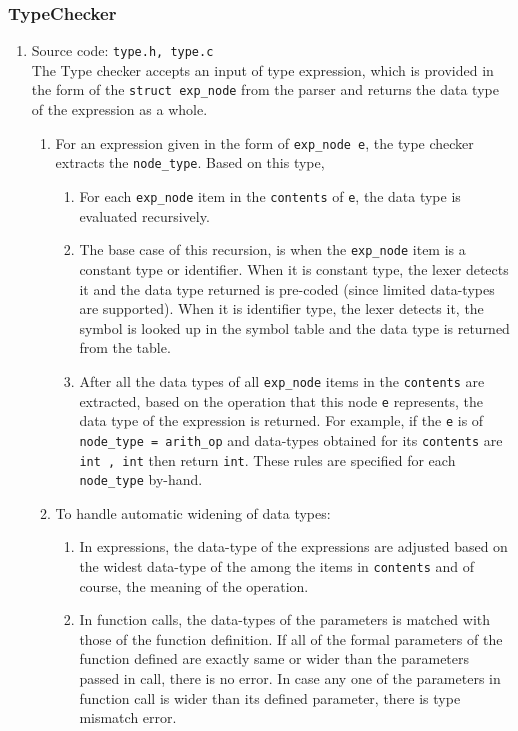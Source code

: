 \documentclass[12pt]{article}
\begin{document}
\subsubsection{TypeChecker} 
\label{AST}
\begin{enumerate}
\item Source code: \texttt{type.h, type.c}
\\ The Type checker accepts an input of type expression, which is provided in the form of the \texttt{struct exp\_node} from the parser and returns the data type of the expression as a whole.
\begin{enumerate}
\item For an expression given in the form of \texttt{exp\_node e}, the type checker extracts the \texttt{node\_type}. Based on this type,  
\begin{enumerate}
\item For each \texttt{exp\_node} item in the \texttt{contents} of \texttt{e}, the data type is evaluated recursively. 
\item The base case of this recursion, is when the \texttt{exp\_node} item is a constant type or identifier.
When it is constant type, the lexer detects it and the data type returned is pre-coded (since limited data-types are supported). When it is identifier type, the lexer detects it, the symbol is looked up in the symbol table and the data type is returned from the table. 
\item After all the data types of all \texttt{exp\_node} items in the \texttt{contents} are extracted, based on the operation that this node \texttt{e} represents, the data type of the expression is returned. For example, if the \texttt{e} is of \texttt{node\_type = arith\_op} and data-types obtained for its \texttt{contents} are \texttt{int , int} then return \texttt{int}. These rules are specified for each \texttt{node\_type} by-hand.
\end{enumerate}

\item To handle automatic widening of data types:
\begin{enumerate}
\item In expressions, the data-type of the expressions are adjusted based on the widest data-type of the among the items in \texttt{contents} and of course, the meaning of the operation. 

\item In function calls, the data-types of the parameters is matched with those of the function definition. If all of the formal parameters of the function defined are exactly same or wider than the parameters passed in call, there is no error. In case any one of the parameters in function call is wider than its defined parameter, there is type mismatch error.


\end{enumerate}
\end{enumerate}
\end{enumerate}
\end{document}
